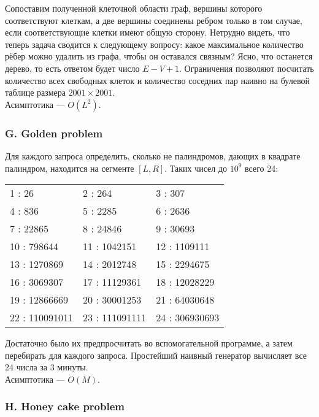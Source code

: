 Сопоставим полученной клеточной области граф, вершины которого соответствуют клеткам, а две вершины соединены ребром только в том случае, если соответствующие клетки имеют общую сторону. Нетрудно видеть, что теперь задача сводится к следующему вопросу: какое максимальное количество рёбер можно удалить из графа, чтобы он оставался связным? Ясно, что останется дерево, то есть ответом будет число $E - V + 1$. Ограничения позволяют посчитать количество всех свободных клеток и количество соседних пар наивно на булевой таблице размера $2001 \times 2001$.\\
Асимптотика --- $O(L^2)$.

\newpage

\subsubsection*{G. Golden problem}

Для каждого запроса определить, сколько не палиндромов, дающих в квадрате палиндром, находится на сегменте $[L, R]$. Таких чисел до $10^9$ всего 24:
\begin{center}
\begin{tabular}{lll}
1 : 26   &
2 : 264  &
3 : 307  \\
4 : 836  &
5 : 2285  &
6 : 2636  \\
7 : 22865  &
8 : 24846  &
9 : 30693  \\
10 : 798644  &
11 : 1042151  &
12 : 1109111  \\
13 : 1270869  &
14 : 2012748  &
15 : 2294675  \\
16 : 3069307  &
17 : 11129361  &
18 : 12028229  \\
19 : 12866669  &
20 : 30001253  &
21 : 64030648  \\
22 : 110091011  &
23 : 111091111  &
24 : 306930693  \\
\end{tabular}
\end{center}

Достаточно было их предпросчитать во вспомогательной программе, а затем перебирать для каждого запроса. Простейший наивный генератор вычисляет все 24 числа за 3 минуты.\\
Асимптотика --- $O(M)$.


\subsubsection*{H. Honey cake problem}

